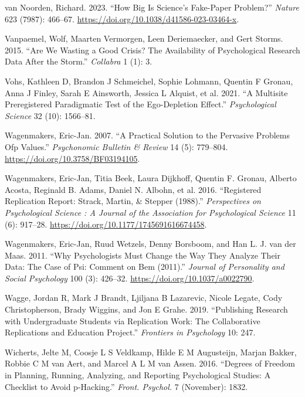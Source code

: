 \documentclass[
  letterpaper,
  DIV=11,
  numbers=noendperiod]{scrreprt}
\newlength{\cslhangindent}
\newenvironment{CSLReferences}[2] %
 {\begin{list}{}{%
  \setlength{\itemindent}{0pt}
  \setlength{\leftmargin}{0pt}
  \setlength{\parsep}{0pt}
  \ifodd #1
   \setlength{\leftmargin}{\cslhangindent}
   \setlength{\itemindent}{-1\cslhangindent}
  \fi
  \setlength{\itemsep}{#2\baselineskip}}}
 {\end{list}}
\begin{document}
\begin{CSLReferences}{1}{0}
van Noorden, Richard. 2023. {``How Big Is Science's Fake-Paper
Problem?''} \emph{Nature} 623 (7987): 466--67.
\url{https://doi.org/10.1038/d41586-023-03464-x}.

Vanpaemel, Wolf, Maarten Vermorgen, Leen Deriemaecker, and Gert Storms.
2015. {``Are We Wasting a Good Crisis? The Availability of Psychological
Research Data After the Storm.''} \emph{Collabra} 1 (1): 3.

Vohs, Kathleen D, Brandon J Schmeichel, Sophie Lohmann, Quentin F
Gronau, Anna J Finley, Sarah E Ainsworth, Jessica L Alquist, et al.
2021. {``A Multisite Preregistered Paradigmatic Test of the
Ego-Depletion Effect.''} \emph{Psychological Science} 32 (10): 1566--81.

Wagenmakers, Eric-Jan. 2007. {``A Practical Solution to the Pervasive
Problems Ofp Values.''} \emph{Psychonomic Bulletin {\&} Review} 14 (5):
779--804. \url{https://doi.org/10.3758/BF03194105}.

Wagenmakers, Eric-Jan, Titia Beek, Laura Dijkhoff, Quentin F. Gronau,
Alberto Acosta, Reginald B. Adams, Daniel N. Albohn, et al. 2016.
{``Registered Replication Report: Strack, Martin, {\&} Stepper
(1988).''} \emph{Perspectives on Psychological Science : A Journal of
the Association for Psychological Science} 11 (6): 917--28.
\url{https://doi.org/10.1177/1745691616674458}.

Wagenmakers, Eric-Jan, Ruud Wetzels, Denny Borsboom, and Han L. J. van
der Maas. 2011. {``Why Psychologists Must Change the Way They Analyze
Their Data: The Case of Psi: Comment on Bem (2011).''} \emph{Journal of
Personality and Social Psychology} 100 (3): 426--32.
\url{https://doi.org/10.1037/a0022790}.

Wagge, Jordan R, Mark J Brandt, Ljiljana B Lazarevic, Nicole Legate,
Cody Christopherson, Brady Wiggins, and Jon E Grahe. 2019. {``Publishing
Research with Undergraduate Students via Replication Work: The
Collaborative Replications and Education Project.''} \emph{Frontiers in
Psychology} 10: 247.

Wicherts, Jelte M, Coosje L S Veldkamp, Hilde E M Augusteijn, Marjan
Bakker, Robbie C M van Aert, and Marcel A L M van Assen. 2016.
{``Degrees of Freedom in Planning, Running, Analyzing, and Reporting
Psychological Studies: A Checklist to Avoid p-Hacking.''} \emph{Front.
Psychol.} 7 (November): 1832.


\end{CSLReferences}
\end{document}
